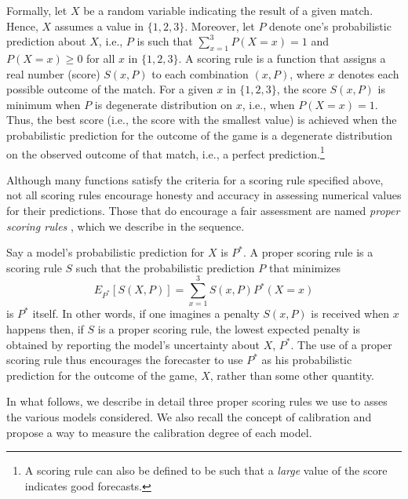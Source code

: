 \documentclass[journal,article,accept,moreauthors,pdftex,12pt,a4paper]{mdpi}
\begin{document}
	Formally, let $X$ be a random variable indicating
	the result of a given match. Hence, $X$ assumes a value in $\{1,2,3\}$. Moreover, let $P$ denote one's probabilistic prediction
	about $X$, i.e., $P$ is such that $\sum_{x=1}^3P(X=x)=1$ and
    $P(X=x)\geq0$ for all $x$ in $\{1,2,3\}$.
	A scoring rule is a function 
	that assigns a real number (score) $S(x,P)$ to each combination $(x,P)$, where $x$ denotes each possible outcome of the match.
	For a given $x$ in $\{1,2,3\}$, the score  $S(x,P)$ is minimum when $P$ is degenerate distribution on $x$, i.e., when $P(X=x)=1$.  
	Thus, the best score (i.e., the score with the smallest value) is achieved when the probabilistic prediction for the outcome of the game is a degenerate  distribution
  on the observed outcome of that match, i.e., a perfect prediction.\footnote{A scoring rule can also be defined to be such that a \emph{large} value of the score indicates good forecasts.}
	
	Although many functions satisfy the criteria for a scoring rule specified above, 
	not all scoring rules encourage honesty and accuracy in assessing numerical values for their predictions.
	Those that do encourage a fair assessment are named \emph{proper scoring rules} \cite{lad}, which we describe in the sequence.
	
	Say a model's probabilistic prediction for $X$ is $P^*.$ A proper scoring rule is a scoring rule $S$ such that the probabilistic prediction $P$ that minimizes 
	$$E_{P^*}[S(X,P)]=\sum_{x=1}^3 S(x,P)P^*(X=x)$$
	 is $P^*$  itself.
	In other words, if one imagines 
	a penalty $S(x,P)$ is received 
	when $x$ happens then, 
	if $S$ is a proper scoring rule, the lowest expected penalty is obtained by reporting the model's  uncertainty about $X$, $P^*$.
	The use of a proper scoring rule thus encourages the forecaster to use $P^*$
	as his probabilistic prediction for the outcome of the game, $X$, rather than some other quantity. 
	
	In what follows, we describe in detail three proper scoring rules we use to asses the various models considered.
	We also recall the concept of calibration and propose a way to measure the calibration degree of each model.
	
\end{document}
